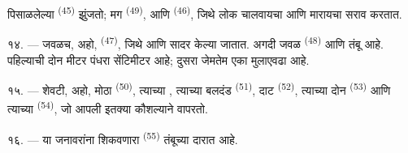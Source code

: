 पिसाळलेल्या  \textsuperscript{(45)} झुंजतो; मग 
\textsuperscript{(49)}, आणि  \textsuperscript{(46)}, जिथे लोक
 चालवायचा आणि  मारायचा सराव करतात.

१४. --- जवळच, अहो,  \textsuperscript{(47)}, जिथे
 आणि  सादर केल्या जातात. अगदी जवळ
 \textsuperscript{(48)} आणि  तंबू आहे.
पहिल्याची  दोन मीटर पंधरा सेंटिमीटर आहे; दुसरा जेमतेम एका मुलाएवढा
आहे.

१५. --- शेवटी, अहो, मोठा  \textsuperscript{(50)}, त्याच्या
, त्याच्या बलदंड  
\textsuperscript{(51)}, दाट  
\textsuperscript{(52)}, त्याच्या दोन  \textsuperscript{(53)} आणि
त्याच्या  \textsuperscript{(54)}, जो आपली  इतक्या
कौशल्याने वापरतो.

१६. --- या जनावरांना शिकवणारा  \textsuperscript{(55)}
तंबूच्या दारात आहे.

\VUsaut{6.0mm}
\VUfilet{22mm}
